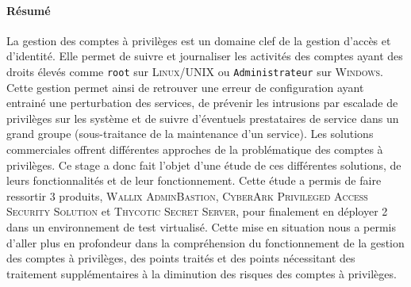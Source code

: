 
\paragraph{Résumé}
La gestion des comptes à privilèges est un domaine clef de la gestion d'accès et d'identité. Elle permet de suivre et journaliser les activités des comptes ayant des droits élevés comme \texttt{root} sur \textsc{Linux/UNIX} ou \texttt{Administrateur} sur \textsc{Windows}. Cette gestion permet ainsi de retrouver une erreur de configuration ayant entrainé une perturbation des services, de prévenir les intrusions par escalade de privilèges sur les système et de suivre d'éventuels prestataires de service dans un grand groupe (sous-traitance de la maintenance d'un service). Les solutions commerciales offrent différentes approches de la problématique des comptes à privilèges. Ce stage a donc fait l'objet d'une étude de ces différentes solutions, de leurs fonctionnalités et de leur fonctionnement. Cette étude a permis de faire ressortir 3 produits, \textsc{Wallix AdminBastion}, \textsc{CyberArk Privileged Access Security Solution} et \textsc{Thycotic Secret Server}, pour finalement en déployer 2 dans un environnement de test virtualisé. Cette mise en situation nous a permis d'aller plus en profondeur dans la compréhension du fonctionnement de la gestion des comptes à privilèges, des points traités et des points nécessitant des traitement supplémentaires à la diminution des risques des comptes à privilèges.

